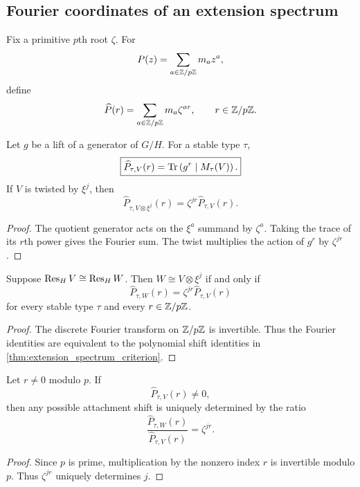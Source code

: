 \subsection{Fourier coordinates of an extension spectrum}

Fix a primitive \(p\)th root \(\zeta\). For
\[
 P(z)=\sum_{a\in\mathbb Z/p\mathbb Z}m_az^a,
\]
define
\[
 \widehat P(r)
 =
 \sum_{a\in\mathbb Z/p\mathbb Z}m_a\zeta^{ar},
 \qquad
 r\in\mathbb Z/p\mathbb Z.
\]

\begin{proposition}\label{prop:fourier_trace}
Let \(g\) be a lift of a generator of \(G/H\). For a stable type \(\tau\),
\[
 \boxed{
 \widehat P_{\tau,V}(r)
 =
 \operatorname{Tr}\left(g^r\mid M_\tau(V)\right).
 }
\]
If \(V\) is twisted by \(\xi^j\), then
\[
 \boxed{
 \widehat P_{\tau,V\otimes\xi^j}(r)
 =
 \zeta^{jr}\widehat P_{\tau,V}(r).
 }
\]
\end{proposition}

\begin{proof}
The quotient generator acts on the \(\xi^a\) summand by \(\zeta^a\). Taking the trace of its \(r\)th power gives the Fourier sum. The twist multiplies the action of \(g^r\) by \(\zeta^{jr}\).
\end{proof}

\begin{corollary}\label{cor:fourier_attachment}
Suppose \(\operatorname{Res}_HV\cong\operatorname{Res}_HW\). Then \(W\cong V\otimes\xi^j\) if and only if
\[
 \boxed{
 \widehat P_{\tau,W}(r)
 =
 \zeta^{jr}\widehat P_{\tau,V}(r)
 }
\]
for every stable type \(\tau\) and every \(r\in\mathbb Z/p\mathbb Z\).
\end{corollary}

\begin{proof}
The discrete Fourier transform on \(\mathbb Z/p\mathbb Z\) is invertible. Thus the Fourier identities are equivalent to the polynomial shift identities in \cref{thm:extension_spectrum_criterion}.
\end{proof}

\begin{corollary}\label{cor:one_fourier_mode}
Let \(r\neq0\) modulo \(p\). If
\[
 \widehat P_{\tau,V}(r)\neq0,
\]
then any possible attachment shift is uniquely determined by the ratio
\[
 \boxed{
 \frac{\widehat P_{\tau,W}(r)}{\widehat P_{\tau,V}(r)}
 =
 \zeta^{jr}.
 }
\]
\end{corollary}

\begin{proof}
Since \(p\) is prime, multiplication by the nonzero index \(r\) is invertible modulo \(p\). Thus \(\zeta^{jr}\) uniquely determines \(j\).
\end{proof}

